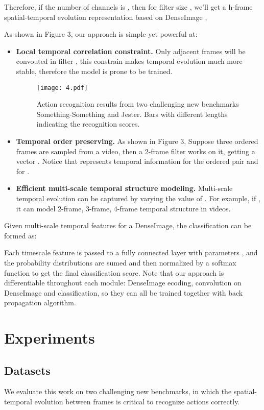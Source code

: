 \documentclass{article}
\begin{document}
Therefore, if the number of channels is , then for filter size , we'll get a h-frame spatial-temporal evolution representation based on DenseImage , 

As shown in Figure 3, our approach is simple yet powerful at:

\begin{itemize}
\item \textbf{Local temporal correlation constraint.} Only adjacent  frames will be convouted in filter , this constrain makes temporal evolution much more stable, therefore the model is prone to be trained. 
\begin{figure*}[t]
	\begin{center}
		\texttt{[image: 4.pdf]}
		\caption{Action recognition results from two challenging new benchmarks Something-Something and Jester. Bars with different lengths indicating the recognition scores.}
		\label{Figure 4.}
	\end{center}
	\vspace{-1em}
\end{figure*}
\item \textbf{Temporal order preserving.} As shown in Figure 3, Suppose three ordered frames  are sampled from a video, then a 2-frame filter works on it, getting a vector . Notice that   represents temporal information for the ordered pair  and  for .
\item \textbf{Efficient multi-scale temporal structure modeling.} Multi-scale temporal evolution can be captured by varying the value of . For example, if , it can model 2-frame, 3-frame, 4-frame temporal structure in videos.
\end{itemize}

Given multi-scale temporal features for a DenseImage, the classification can be formed as: 

Each timescale feature  is passed to a fully connected layer  with parameters , and the probability distributions are sumed and then normalized by a softmax function to get the final classification score. Note that our approach is differentiable throughout each module: DenseImage ecoding, convolution on DenseImage and classification, so they can all be trained together with back propagation algorithm.

\section{Experiments}
\subsection{Datasets}
We evaluate this work on two challenging new benchmarks, in which the spatial-temporal evolution between frames is critical to recognize actions correctly.
\end{document}
